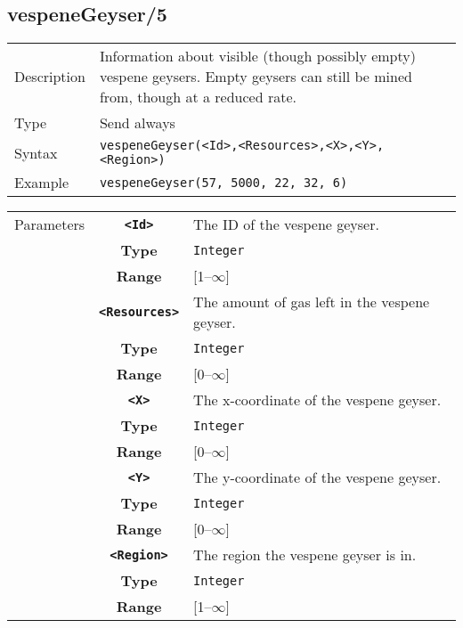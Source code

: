 \subsection{vespeneGeyser/5}
\begin{tabularx}{\textwidth}{lX}
 Description & Information about visible (though possibly empty) vespene geysers. Empty geysers can still be mined from, though at a reduced rate. \\
 Type & Send always \\
 Syntax & \verb|vespeneGeyser(<Id>,<Resources>,<X>,<Y>,<Region>)| \\
 Example & \verb|vespeneGeyser(57, 5000, 22, 32, 6)| \\
 \end{tabularx}
 \begin{tabularx}{\textwidth}{l | c | p{8cm}|}
 \cline{2-3}
 Parameters & \textbf{\verb|<Id>|} & The ID of the vespene geyser.\\
            & \textbf{Type} & \verb|Integer| \\
            & \textbf{Range} & [1--$\infty$] \\
            \cline{2-3}
            & \textbf{\verb|<Resources>|} & The amount of gas left in the vespene geyser.\\
            & \textbf{Type} & \verb|Integer| \\
            & \textbf{Range} & [0--$\infty$] \\
            \cline{2-3}
            & \textbf{\verb|<X>|} & The x-coordinate of the vespene geyser.\\
            & \textbf{Type} & \verb|Integer| \\
            & \textbf{Range} & [0--$\infty$] \\
            \cline{2-3}
            & \textbf{\verb|<Y>|} & The y-coordinate of the vespene geyser.\\
            & \textbf{Type} & \verb|Integer| \\
            & \textbf{Range} & [0--$\infty$] \\
            \cline{2-3}
            & \textbf{\verb|<Region>|} & The region the vespene geyser is in.\\
            & \textbf{Type} & \verb|Integer| \\
            & \textbf{Range} & [1--$\infty$] \\
            \cline{2-3}
\end{tabularx}

